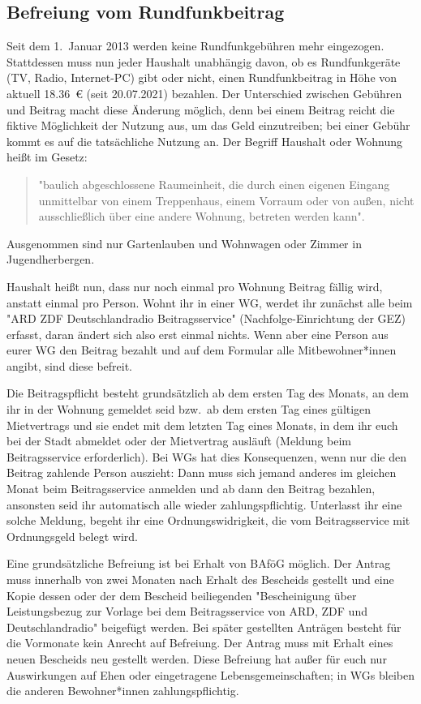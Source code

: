 \begin{multicols}{2}
\subsection{Befreiung vom Rundfunkbeitrag}
Seit dem 1.~Januar 2013 werden keine Rundfunkgebühren mehr eingezogen.
Stattdessen muss nun jeder Haushalt unabhängig davon, ob es Rundfunkgeräte (TV, Radio, Internet-PC) gibt oder nicht, einen Rundfunkbeitrag in Höhe von aktuell \SI{18,36}{\euro} (seit 20.07.2021) bezahlen.
Der Unterschied zwischen Gebühren und Beitrag macht diese Änderung möglich, denn bei einem Beitrag reicht die fiktive Möglichkeit der Nutzung aus, um das Geld einzutreiben; bei einer Gebühr kommt es auf die tatsächliche Nutzung an.
Der Begriff Haushalt oder Wohnung heißt im Gesetz:
\begin{quote}
	"baulich abgeschlossene Raumeinheit, die durch einen eigenen Eingang unmittelbar von einem Treppenhaus, einem Vorraum oder von außen, nicht ausschließlich über eine andere Wohnung, betreten werden kann".
\end{quote}
Ausgenommen sind nur Gartenlauben und Wohnwagen oder Zimmer in Jugendherbergen.

Haushalt heißt nun, dass nur noch einmal pro Wohnung Beitrag fällig wird, anstatt einmal pro Person.
Wohnt ihr in einer WG, werdet ihr zunächst alle beim "ARD ZDF Deutschlandradio Beitragsservice" (Nachfolge-Einrichtung der GEZ) erfasst, daran ändert sich also erst einmal nichts.
Wenn aber eine Person aus eurer WG den Beitrag bezahlt und auf dem Formular alle Mitbewohner*innen angibt, sind diese befreit.

Die Beitragspflicht besteht grundsätzlich ab dem ersten Tag des Monats, an dem ihr in der Wohnung gemeldet seid bzw.\ ab dem ersten Tag eines gültigen Mietvertrags und sie endet mit dem letzten Tag eines Monats, in dem ihr euch bei der Stadt abmeldet oder der Mietvertrag ausläuft (Meldung beim Beitragsservice erforderlich).
Bei WGs hat dies Konsequenzen, wenn nur die den Beitrag zahlende Person auszieht: Dann muss sich jemand anderes im gleichen Monat beim Beitragsservice anmelden und ab dann den Beitrag bezahlen, ansonsten seid ihr automatisch alle wieder zahlungspflichtig.
Unterlasst ihr eine solche Meldung, begeht ihr eine Ordnungswidrigkeit, die vom Beitragsservice mit Ordnungsgeld belegt wird.

Eine grundsätzliche Befreiung ist bei Erhalt von BAföG möglich.
Der Antrag muss innerhalb von zwei Monaten nach Erhalt des Bescheids gestellt und eine Kopie dessen oder der dem Bescheid beiliegenden "Bescheinigung über Leistungsbezug zur Vorlage bei dem Beitragsservice von ARD, ZDF und Deutschlandradio" beigefügt werden.
Bei später gestellten Anträgen besteht für die Vormonate kein Anrecht auf Befreiung.
Der Antrag muss mit Erhalt eines neuen Bescheids neu gestellt werden.
Diese Befreiung hat außer für euch nur Auswirkungen auf Ehen oder eingetragene Lebensgemeinschaften; in WGs bleiben die anderen Bewohner*innen zahlungspflichtig.


\end{multicols}
